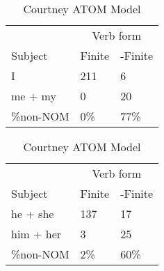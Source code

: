 \begin{table}[]
    \caption{Courtney ATOM Model}
    \begin{minipage}{0.5\textwidth}
    \centering
    \begin{tabular}{@{}lll@{}}
        \toprule
         &\multicolumn{2}{c}{Verb form}\\
         \cline{2-3}
        Subject & Finite & -Finite \\
        \midrule
        I & 211 & 6 \\
        me + my & 0 & 20 \\
        \hline
        \%non-NOM & 0\% & 77\% \\
        \bottomrule
    \end{tabular}
\end{minipage}
\begin{minipage}{0.5\textwidth}
    \centering
    \begin{tabular}{@{}lll@{}}
        \toprule
         &\multicolumn{2}{c}{Verb form}\\
         \cline{2-3}
        Subject & Finite & -Finite \\
        \midrule
        he + she & 137 & 17 \\
        him + her & 3 & 25 \\
        \hline
        \%non-NOM & 2\% & 60\% \\
        \bottomrule
    \end{tabular}
    \end{minipage}
    \begin{minipage}{0.5\textwidth}
    

\end{minipage}
\end{table}
